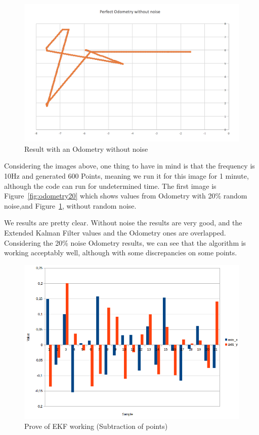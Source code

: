 \documentclass[a4paper]{IEEEtran}
\begin{document}
\begin{figure}[!ht]
  \centering
  \includegraphics[width=0.8\columnwidth]{./perfectodometry}
  \caption{Result with an Odometry without noise}
  \label{fig:perfectodometry}
\end{figure}

Considering the images above, one thing to have in mind is that the frequency is 10Hz and generated 600 Points, meaning we run it for this image for 1 minute, although the code can run for undetermined time. The first image is Figure~\ref{fig:odometry20} which shows values from Odometry with 20\% random noise,and Figure~\ref{fig:perfectodometry}, without random noise. \par
We results are pretty clear. Without noise the results are very good, and the Extended Kalman Filter values and the Odometry ones are overlapped. Considering the 20\% noise Odometry results, we can see that the algorithm is working acceptably well, although with some discrepancies on some points. 

\begin{figure}[!ht]
  \centering
  \includegraphics[width=0.8\columnwidth]{./prove}
  \caption{Prove of EKF working (Subtraction of points)}
  \label{fig:prove}
\end{figure}
\end{document}
